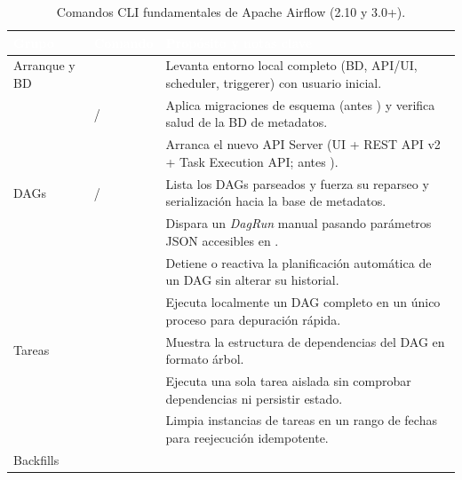 \begin{table}[htbp]
\centering
\caption{Comandos CLI fundamentales de Apache Airflow (2.10 y 3.0+).}
\label{tab:cheat-airflow-cli}
\scriptsize
\renewcommand{\arraystretch}{1.12}
\begin{tabularx}{\textwidth}{@{}L{1.6cm} L{6.8cm} Y@{}}
\toprule
{}
\textcolor{white}{\sffamily\bfseries Grupo} &
\textcolor{white}{\sffamily\bfseries Comando} &
\textcolor{white}{\sffamily\bfseries Propósito y notas clave} \\
\midrule
Arranque y BD &
 &
Levanta entorno local completo (BD, API/UI, scheduler, triggerer) con usuario inicial. \\
 &
 /  &
Aplica migraciones de esquema (antes ) y verifica salud de la BD de metadatos. \\
 &
  &
Arranca el nuevo API Server (UI + REST API v2 + Task Execution API; antes ). \\
\midrule
{}
DAGs &
 /  &
Lista los DAGs parseados y fuerza su reparseo y serialización hacia la base de metadatos. \\
 &
 &
Dispara un \textit{DagRun} manual pasando parámetros JSON accesibles en . \\
 &
 &
Detiene o reactiva la planificación automática de un DAG sin alterar su historial. \\
 &
 &
Ejecuta localmente un DAG completo en un único proceso para depuración rápida. \\
\midrule
{}
Tareas &
 &
Muestra la estructura de dependencias del DAG en formato árbol. \\
 &
 &
Ejecuta una sola tarea aislada sin comprobar dependencias ni persistir estado. \\
 &
 &
Limpia instancias de tareas en un rango de fechas para reejecución idempotente. \\
\midrule
Backfills &
  &

\end{tabularx}
\end{table}
